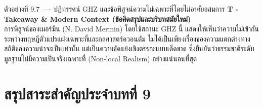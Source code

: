 \begin{psctbox}{ตัวอย่างที่ 9.7 ---- ปฏิทรรศน์ GHZ และข้อพิสูจน์ความไม่เฉพาะที่โดยไม่อาศัยอสมการ}
\vspace{4pt}
\noindent\textbf{T - Takeaway \& Modern Context (ข้อคิดสรุปและบริบทสมัยใหม่)} \\
การพิสูจน์ของเมอร์มิน (N. David Mermin) โดยใช้สถานะ GHZ นี้ แสดงให้เห็นว่าความไม่เข้ากันระหว่างทฤษฎีตัวแปรแฝงเฉพาะที่และกลศาสตร์ควอนตัม ไม่ได้เป็นเพียงเรื่องของความแตกต่างทางสถิติของความน่าจะเป็นเท่านั้น แต่เป็นความขัดแย้งเชิงตรรกะแบบเด็ดขาด ซึ่งยืนยันว่าธรรมชาติระดับมูลฐานไม่มีความเป็นจริงเฉพาะที่ (Non-local Realism) อย่างแน่นอนที่สุด
\end{psctbox}

\section{สรุปสาระสำคัญประจำบทที่ 9}

